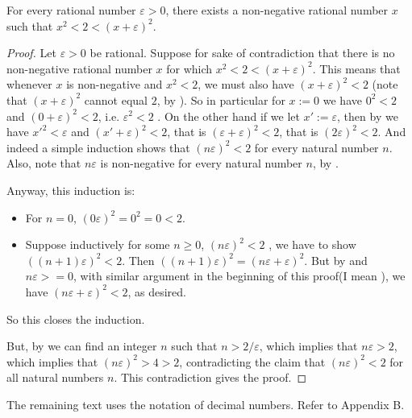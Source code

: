 \begin{proposition} \label{prop 4.4.5}
For every rational number \(\varepsilon > 0\), there exists a non-negative rational number \(x\) such that \(x^2 < 2 < (x + \varepsilon)^2\).
\end{proposition}

\begin{proof}
Let \(\varepsilon > 0\) be rational.
Suppose for sake of contradiction that there is no non-negative rational number \(x\) for which \(x^2 < 2 < (x + \varepsilon)^2\).
This means that whenever \(x\) is non-negative and \(x^2 < 2\), we must also have \((x + \varepsilon)^2 < 2\) 
(note that \((x + \varepsilon)^2\) cannot equal \(2\), by ).
So in particular for \(x := 0\) we have \(0^2 < 2\) and \((0 + \varepsilon)^2 < 2\), i.e. \(\varepsilon^2 < 2\) .
On the other hand if we let \(x' := \varepsilon\), then by  we have \(x'^2 < \varepsilon\) and \((x' + \varepsilon)^2 < 2\), that is \((\varepsilon + \varepsilon)^2 < 2\), that is \((2\varepsilon)^2 < 2\).
And indeed a simple induction shows that \((n\varepsilon)^2 < 2\) for every natural number \(n\). Also, note that \(n\varepsilon\) is non-negative for every natural number \(n\), by .

Anyway, this induction is:
\begin{itemize}
    \item
        For \(n = 0\), \((0\varepsilon)^2 = 0^2 = 0 < 2\).
    \item
        Suppose inductively for some \(n \ge 0\), \((n\varepsilon)^2 < 2\) , we have to show \(((n + 1)\varepsilon)^2 < 2\).
        Then \(((n + 1)\varepsilon)^2 = (n\varepsilon + \varepsilon)^2\).
        But by  and \(n\varepsilon >= 0\), with similar argument in the beginning of this proof(I mean ), we have \((n\varepsilon + \varepsilon)^2 < 2\), as desired.
\end{itemize}
So this closes the induction.

But, by  we can find an integer \(n\) such that \(n > 2 / \varepsilon\), which implies that \(n\varepsilon > 2\), which implies that \((n\varepsilon)^2 > 4 > 2\), contradicting the claim that \((n\varepsilon)^2 < 2\) for all natural numbers \(n\).
This contradiction gives the proof.
\end{proof}

\begin{note}
The remaining text uses the notation of decimal numbers. Refer to Appendix B.
\end{note}

